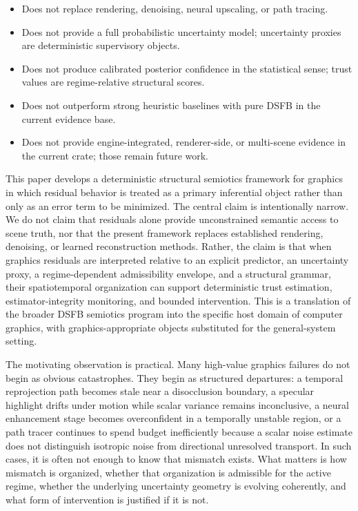 \documentclass[11pt]{article}
\theoremstyle{definition}
\theoremstyle{plain}
\begin{document}
\begin{tcolorbox}[colback=gray!6,colframe=black!35,title={\small\textbf{What this framework does not do}},
  fonttitle=\bfseries,boxrule=0.4pt,left=4pt,right=4pt,top=3pt,bottom=3pt]
\small
\begin{itemize}[leftmargin=1.2em,topsep=2pt,itemsep=1pt]
  \item Does not replace rendering, denoising, neural upscaling, or path tracing.
  \item Does not provide a full probabilistic uncertainty model; uncertainty proxies are deterministic supervisory objects.
  \item Does not produce calibrated posterior confidence in the statistical sense; trust values are regime-relative structural scores.
  \item Does not outperform strong heuristic baselines with pure DSFB in the current evidence base.
  \item Does not provide engine-integrated, renderer-side, or multi-scene evidence in the current crate; those remain future work.
\end{itemize}
\end{tcolorbox}

This paper develops a deterministic structural semiotics framework for graphics in which residual behavior is treated as a primary inferential object rather than only as an error term to be minimized. The central claim is intentionally narrow. We do not claim that residuals alone provide unconstrained semantic access to scene truth, nor that the present framework replaces established rendering, denoising, or learned reconstruction methods. Rather, the claim is that when graphics residuals are interpreted relative to an explicit predictor, an uncertainty proxy, a regime-dependent admissibility envelope, and a structural grammar, their spatiotemporal organization can support deterministic trust estimation, estimator-integrity monitoring, and bounded intervention. This is a translation of the broader DSFB semiotics program into the specific host domain of computer graphics, with graphics-appropriate objects substituted for the general-system setting. 

The motivating observation is practical. Many high-value graphics failures do not begin as obvious catastrophes. They begin as structured departures: a temporal reprojection path becomes stale near a disocclusion boundary, a specular highlight drifts under motion while scalar variance remains inconclusive, a neural enhancement stage becomes overconfident in a temporally unstable region, or a path tracer continues to spend budget inefficiently because a scalar noise estimate does not distinguish isotropic noise from directional unresolved transport. In such cases, it is often not enough to know that mismatch exists. What matters is how mismatch is organized, whether that organization is admissible for the active regime, whether the underlying uncertainty geometry is evolving coherently, and what form of intervention is justified if it is not.
\end{document}
